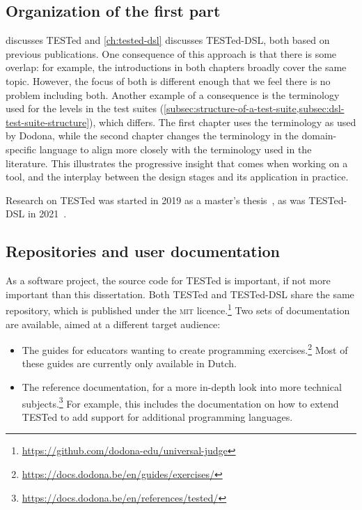 \documentclass[../main]{subfiles}
\begin{document}
\subsection{Organization of the first part}\label{subsec:organization-of-the-first-part}

 discusses TESTed and \cref{ch:tested-dsl} discusses TESTed-DSL, both based on previous publications.
One consequence of this approach is that there is some overlap: for example, the introductions in both chapters broadly cover the same topic.
However, the focus of both is different enough that we feel there is no problem including both.
Another example of a consequence is the terminology used for the levels in the test suites (\cref{subsec:structure-of-a-test-suite,subsec:dsl-test-suite-structure}), which differs.
The first chapter uses the terminology as used by Dodona, while the second chapter changes the terminology in the domain-specific language to align more closely with the terminology used in the literature.
This illustrates the progressive insight that comes when working on a tool, and the interplay between the design stages and its application in practice.

Research on TESTed was started in 2019 as a master's thesis~\autocite{strijbolTESTedOneJudge2020}, as was TESTed-DSL in 2021~\autocite{selsTESTedProgrammeertaalonafhankelijkTesten2021}.

\subsection{Repositories and user documentation}\label{subsec:repositories-and-code}

As a software project, the source code for TESTed is important, if not more important than this dissertation.
Both TESTed and TESTed-DSL share the same repository, which is published under the \textsc{mit} licence.\footnote{\url{https://github.com/dodona-edu/universal-judge}}
Two sets of documentation are available, aimed at a different target audience:
\begin{itemize}
    \item The guides for educators wanting to create programming exercises.\footnote{\url{https://docs.dodona.be/en/guides/exercises/}}
    Most of these guides are currently only available in Dutch.
    \item The reference documentation, for a more in-depth look into more technical subjects.\footnote{\url{https://docs.dodona.be/en/references/tested/}}
    For example, this includes the documentation on how to extend TESTed to add support for additional programming languages.
\end{itemize}
\end{document}
